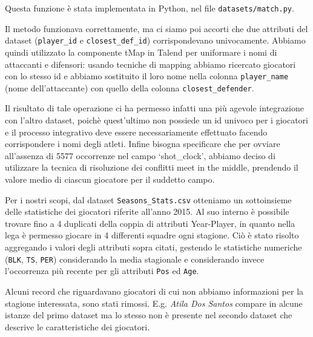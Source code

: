 Questa funzione è stata implementata in Python, nel file \texttt{datasets/match.py}.
\par
Il metodo funzionava correttamente, ma ci siamo poi accorti che due attributi del dataset (\texttt{player\_id} e \texttt{closest\_def\_id}) corrispondevano univocamente. Abbiamo quindi utilizzato la componente tMap in Talend per uniformare i nomi di attaccanti e difensori: usando tecniche di mapping abbiamo ricercato giocatori con lo stesso id e abbiamo sostituito il loro nome nella colonna \texttt{player\_name} (nome dell’attaccante) con quello della colonna \texttt{closest\_defender}.
\par
Il risultato di tale operazione ci ha permesso infatti una più agevole integrazione con l’altro dataset, poichè quest’ultimo non possiede un id univoco per i giocatori e il processo integrativo deve essere necessariamente effettuato facendo corrispondere i nomi degli atleti.
Infine bisogna specificare che per ovviare all’assenza di 5577 occorrenze nel campo ‘shot\_clock’, abbiamo deciso di utilizzare la tecnica di risoluzione dei conflitti meet in the middle, prendendo il valore medio di ciascun giocatore per il suddetto campo.
\par
Per i nostri scopi, dal dataset \texttt{Seasons\_Stats.csv} otteniamo un sottoinsieme delle statistiche dei giocatori riferite all’anno 2015. Al suo interno è possibile trovare fino a 4 duplicati della coppia di attributi Year-Player, in quanto nella lega è permesso giocare in 4 differenti squadre ogni stagione. Ciò è stato risolto aggregando i valori degli attributi sopra citati, gestendo le statistiche numeriche (\texttt{BLK}, \texttt{TS}, \texttt{PER}) considerando la media stagionale e considerando invece l’occorrenza più recente per gli attributi \texttt{Pos} ed \texttt{Age}.
\par
Alcuni record che riguardavano giocatori di cui non abbiamo informazioni per la stagione interessata, sono stati rimossi. E.g. \textit{Atila Dos Santos} compare in alcune istanze del primo dataset ma lo stesso non è presente nel secondo dataset che descrive le caratteristiche dei giocatori.
